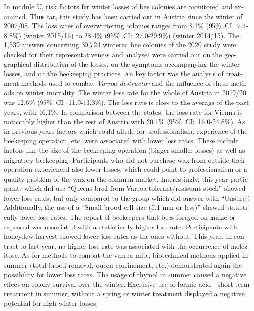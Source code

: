 \begin{otherlanguage}{english}
In module U, risk factors for winter losses of bee colonies are monitored and examined. Thus far, this study has been carried out in Austria since the winter of 2007/08. The loss rates of overwintering colonies ranges from 8.1\% (95\%~CI:~7.4-8.8\%) (winter 2015/16) to 28.4\% (95\%~CI:~27.0-29.9\%) (winter 2014/15). 
\newline
The 1,539 answers concerning 30,724 wintered bee colonies of the 2020 study were checked for their representativeness and analyses were carried out on the geographical distribution of the losses, on the symptoms accompanying the winter losses, and on the beekeeping practices. An key factor was the analysis of treatment methods used to combat \textit{Varroa destructor} and the influence of these methods on winter mortality. 
\newline
The winter loss rate for the whole of Austria in 2019/20 was 12.6\% (95\%~CI:~11.9-13.3\%). The loss rate is close to the average of the past years, with 16,1\%. In comparison between the states, the loss rate for Vienna is noticeably higher than the rest of Austria with 20.1\% (95\%~CI:~16.0-24.8\%).
\newline
As in previous years factors which could allude for professionalism, experience of the beekeeping operation, etc. were associated with lower loss rates. These include factors like the size of the beekeeping operation (bigger smaller losses) as well as migratory beekeeping. Participants who did not purchase wax from outside their operation experienced also lower losses, which could point to professionalism or a quality problem of the wax on the common market.
\newline
Interestingly, this year participants which did use \enquote{Queens bred from Varroa tolerant/resistant stock} showed lower loss rates, but only compared to the group which did answer with \enquote{Unsure}. Additionally, the use of a \enquote{Small brood cell size (5.1 mm or less)} showed statistically lower loss rates.
\newline
The report of beekeepers that bees foraged on maize or rapeseed was associated with a statistically higher loss rate. Participants with honeydew harvest showed lower loss rates as the ones without. This year, in contrast to last year, no higher loss rate was associated with the occurrence of melezitose.
\newline
As for methods to combat the varroa mite, biotechnical methods applied in summer (total brood removal, queen confinement, etc.) demonstrated again the possibility for lower loss rates. The usage of thymol in summer caused a negative effect on colony survival over the winter. Exclusive use of formic acid - short term treatment in summer, without a spring or winter treatment displayed a negative potential for high winter losses.

\end{otherlanguage}
